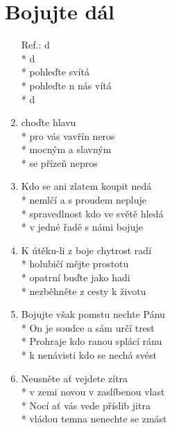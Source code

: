 \section{Bojujte dál}
\begin{enumerate}
\item[Ref.:]    d \\*
  d \\*
pohleďte   svítá \\*
pohleďte n  nás vítá \\*
  d 
\item {} choďte  hlavu  \\*
 pro vás vavřín neros \\*
 mocným  a slavným  \\*
 se přízeň nepros 
\item Kdo se ani zlatem koupit nedá \\*
nemlčí a s proudem nepluje \\*
spravedlnost kdo ve světě hledá \\*
v jedné řadě s námi bojuje 
\item K útěku-li z boje chytrost radí \\*
holubičí mějte prostotu \\*
opatrní buďte jako hadi \\*
nezběhněte z cesty k životu 
\item Bojujte však pomstu nechte Pánu \\*
On je soudce a sám určí trest \\*
Prohraje kdo ranou splácí ránu \\*
k nenávisti kdo se nechá svést \pagebreak
\item Neusněte ať vejdete zítra \\*
v zemi novou v zaslíbenou vlast \\*
Nocí ať vás vede příslib jitra \\*
vládou temna nenechte se zmást 
\end{enumerate}
